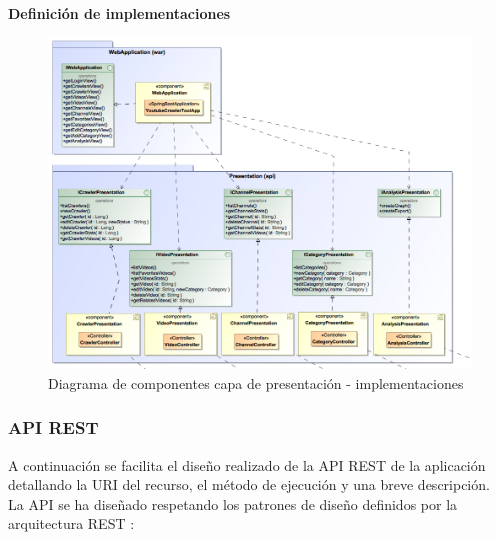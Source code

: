 \documentclass[11pt,a4paper]{article}
\begin{document}
\noindent\textbf{Definición de implementaciones}
\begin{figure}[H]
\centering
\includegraphics[scale=0.25]{diseno/presentacion/ComponentDiagram3.png}
\caption{Diagrama de componentes capa de presentación - implementaciones}
\end{figure}

\subsubsection{API REST}\label{rest} 
A continuación se facilita el diseño realizado de la API REST de la aplicación detallando la URI del recurso, el método de ejecución y una breve descripción.
\\

La API se ha diseñado respetando los patrones de diseño definidos por la arquitectura REST \cite{20}:
\\
\end{document}
